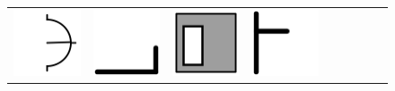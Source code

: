 \documentclass[doc]{apa6}
\newcommand{\stimulusscale}{.1}
\begin{document}
\begin{figure}[t]
\begin{center}
\begin{tabular}{c|cccccccc}
\includegraphics[scale=\stimulusscale]{./set15stim75.png} &
\includegraphics[scale=\stimulusscale]{./set16stim75.png} &
\includegraphics[scale=\stimulusscale]{./set17stim75.png} &
\includegraphics[scale=\stimulusscale]{./set18stim75.png} &

\end{tabular}
\end{center}
\end{figure}
\end{document}
